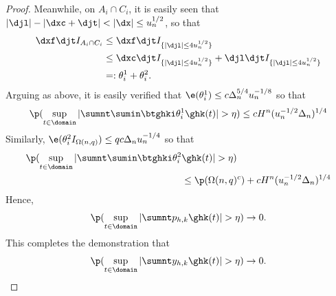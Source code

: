 \begin{proof}
\begin{comment}
\end{comment}
Meanwhile, on $A_i \cap C_i$, it is easily seen that $\vert \djl \vert - \vert \dxc + \djt \vert < \vert \dx \vert \le u_n^{1/2}$, so that
\begin{align}
  \notag
  \dxf \djt I_{A_i \cap C_i} &\le \dxf \djt I_{\{\vert \djl \vert \le 4 u^{1/2}_n\}}\\
   &\le \dxc \djt I_{\{\vert \djl \vert \le 4 u^{1/2}_n\}} +  \djl \djt I_{\{\vert \djl \vert \le 4 u^{1/2}_n\}}\notag\\
   & =: \theta_i^1 + \theta_i^2\notag. 
  \label{}
\end{align}
Arguing as above, it is easily verified that $\e(\theta_i^1)  \le c \Delta_n^{5/4} u_n^{-1/8}$  so that 
\begin{align} 
  \p( \sup_{t \in \domain}\vert \sumnt \sumin \btghki \theta^1_i \ghk(t)\vert > \eta) \le cH^n (u^{-1/2}_n\Delta_n)^{1/4} \notag \end{align}
Similarly,  $\e(\theta_i^2 I_{\Omega(n,q)}) \le q c \Delta_n u^{-1/4}_n$ so that  
\begin{align} 
  \p( \sup_{t \in \domain}\vert \sumnt \sumin \btghki \theta^2_i &\ghk(t)\vert > \eta) \notag \\ &\le \p(\Omega(n,q)^c) + cH^n (u^{-1/2}_n\Delta_n)^{1/4} \notag \end{align}
Hence, 
\begin{align}
  \p(\sup_{t \in \domain} \vert \sumnt p_{h,k} \ghk(t) \vert > \eta) \to 0.\notag
  \label{}
\end{align}
This completes the demonstration  that 
\begin{align}
  \p(\sup_{t \in \domain} \vert \sumnt y_{h,k} \ghk(t) \vert > \eta) \to 0.\notag
  \label{}
\end{align}


\end{proof}
